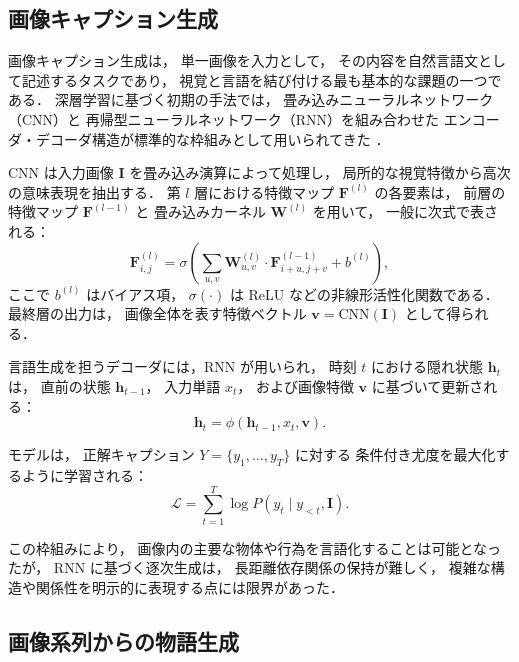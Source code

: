 \documentclass[a4j,12pt,dvipdfmx]{jsreport}
\begin{document}
\subsection{画像キャプション生成}

画像キャプション生成は，
単一画像を入力として，
その内容を自然言語文として記述するタスクであり，
視覚と言語を結び付ける最も基本的な課題の一つである．
深層学習に基づく初期の手法では，
畳み込みニューラルネットワーク（CNN）と
再帰型ニューラルネットワーク（RNN）を組み合わせた
エンコーダ・デコーダ構造が標準的な枠組みとして用いられてきた
\cite{vinyals2015show,karpathy2015deep}．

CNN は入力画像 $\mathbf{I}$ を畳み込み演算によって処理し，
局所的な視覚特徴から高次の意味表現を抽出する．
第 $l$ 層における特徴マップ $\mathbf{F}^{(l)}$ の各要素は，
前層の特徴マップ $\mathbf{F}^{(l-1)}$ と
畳み込みカーネル $\mathbf{W}^{(l)}$ を用いて，
一般に次式で表される：
\begin{equation}
   \mathbf{F}^{(l)}_{i,j}
   =
   \sigma\!\left(
   \sum_{u,v}
   \mathbf{W}^{(l)}_{u,v}
   \cdot
   \mathbf{F}^{(l-1)}_{i+u,j+v}
   + b^{(l)}
   \right),
\end{equation}
ここで $b^{(l)}$ はバイアス項，
$\sigma(\cdot)$ は ReLU などの非線形活性化関数である．
最終層の出力は，
画像全体を表す特徴ベクトル
$\mathbf{v} = \mathrm{CNN}(\mathbf{I})$
として得られる．

言語生成を担うデコーダには，RNN が用いられ，
時刻 $t$ における隠れ状態 $\mathbf{h}_t$ は，
直前の状態 $\mathbf{h}_{t-1}$，
入力単語 $x_t$，
および画像特徴 $\mathbf{v}$ に基づいて更新される：
\begin{equation}
   \mathbf{h}_t
   =
   \phi(\mathbf{h}_{t-1}, x_t, \mathbf{v}).
\end{equation}

モデルは，
正解キャプション $Y = \{y_1,\ldots,y_T\}$ に対する
条件付き尤度を最大化するように学習される：
\begin{equation}
   \mathcal{L}
   =
   \sum_{t=1}^{T}
   \log P(y_t \mid y_{<t}, \mathbf{I}).
\end{equation}

この枠組みにより，
画像内の主要な物体や行為を言語化することは可能となったが，
RNN に基づく逐次生成は，
長距離依存関係の保持が難しく，
複雑な構造や関係性を明示的に表現する点には限界があった．

\subsection{画像系列からの物語生成}
\end{document}

